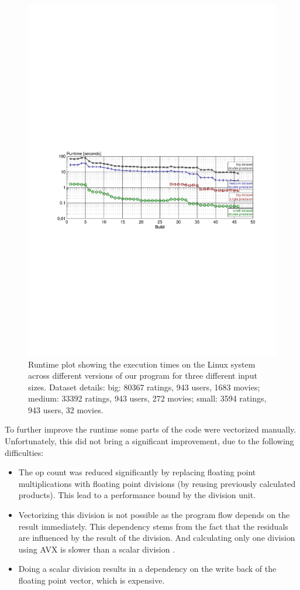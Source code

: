 \begin{figure}\centering
  \includegraphics[scale = 1, trim={7cm 11cm 6.4cm 14cm}]{graphics/runtime_plot.pdf}
  \caption{Runtime plot showing the execution times on the Linux system across different versions of our program for three different input sizes. Dataset details: big: 80367 ratings, 943 users, 1683 movies; medium: 33392 ratings, 943 users, 272 movies; small: 3594 ratings, 943 users, 32 movies.\label{runtime}}
\end{figure}

To further improve the runtime some parts of the code were vectorized manually. Unfortunately, this did not bring a significant improvement, due to the following difficulties:
\begin{itemize}
	\item The op count was reduced significantly by replacing floating point multiplications with floating point divisions (by reusing previously calculated products). This lead to a performance bound by the division unit.
	\item Vectorizing this division is not possible as the program flow depends on the result immediately. This dependency stems from the fact that the residuals are influenced by the result of the division. And calculating only one division using AVX is slower than a scalar division \cite{intrinsics_guide}.
	\item Doing a scalar division results in a dependency on the write back of the floating point vector, which is expensive.
\end{itemize}
